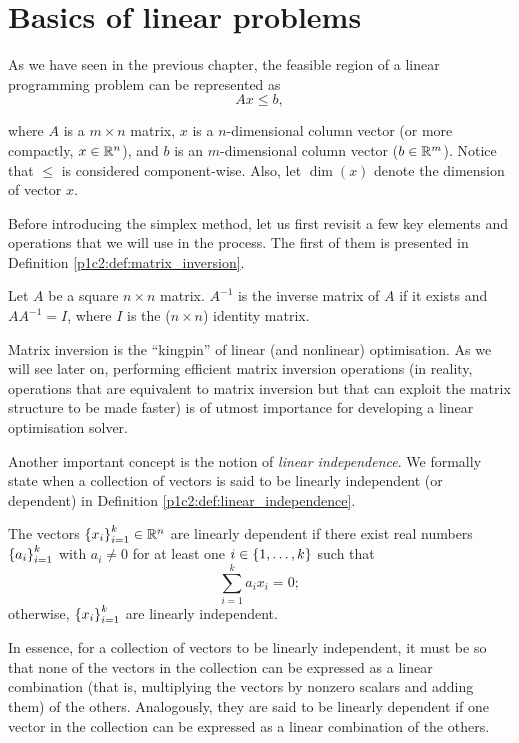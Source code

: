 \section{Basics of linear problems}

As we have seen in the previous chapter, the feasible region of a linear programming problem can be represented as
%
\begin{equation} \label{p1c2:eq:feasible_region_inequality}
	Ax \leq b,	
\end{equation}

where $A$ is a $m \times n$ matrix, $x$ is a $n$-dimensional column vector (or more compactly, $x \in \mathbb{R}^n$), and $b$ is an $m$-dimensional column vector ($b \in \mathbb{R}^m$). Notice that $\leq$ is considered component-wise. Also, let $\dim(x)$ denote the dimension of vector $x$.

Before introducing the simplex method, let us first revisit a few key elements and operations that we will use in the process. The first of them is presented in Definition \ref{p1c2:def:matrix_inversion}.
%
\begin{definition} \label{p1c2:def:matrix_inversion}
	Let $A$ be a square $n \times n$ matrix. $A^{-1}$ is the inverse matrix of $A$ if it exists and $AA^{-1} = I$, where  $I$ is the ($n \times n$) identity matrix.
\end{definition}
%
Matrix inversion is the ``kingpin'' of linear (and nonlinear) optimisation. As we will see later on, performing efficient matrix inversion operations (in reality, operations that are equivalent to matrix inversion but that can exploit the matrix structure to be made faster) is of utmost importance for developing a linear optimisation solver. 

Another important concept is the notion of \emph{linear independence}. We formally state when a collection of vectors is said to be linearly independent (or dependent) in Definition \ref{p1c2:def:linear_independence}. 

%
\begin{definition} \label{p1c2:def:linear_independence}
	The vectors $\left\{ x_i \right \}_{i=1}^k \in \mathbb{R}^n$  are linearly dependent if there exist real numbers $\left\{ a_i \right \}_{i=1}^k$ with $a_i \neq 0$ for at least one $i \in \left\{ 1,\dots, k \right \}$ such that
	$$
		\sum_{i=1}^k a_i x_i= 0;
	$$
	otherwise, $\left\{ x_i \right \}_{i=1}^k$ are linearly independent.
\end{definition}

In essence, for a collection of vectors to be linearly independent, it must be so that none of the vectors in the collection can be expressed as a linear combination (that is, multiplying the vectors by nonzero scalars and adding them) of the others. Analogously, they are said to be linearly dependent if one vector in the collection can be expressed as a linear combination of the others. 

